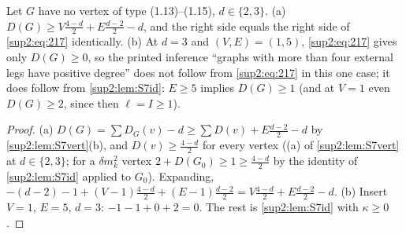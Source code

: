 \begin{lemma}\label{sup2:lem:S7-217}
Let $G$ have no vertex of type (1.13)--(1.15), $d\in\{2,3\}$. \textup{(a)} $D(G)\ge V\frac{4-d}2+E\frac{d-2}2-d$, and the right side equals the right side of \eqref{sup2:eq:217} identically. \textup{(b)} At $d=3$ and $(V,E)=(1,5)$, \eqref{sup2:eq:217} gives only $D(G)\ge0$, so the printed inference ``graphs with more than four external legs have positive degree'' does not follow from \eqref{sup2:eq:217} in this one case; it does follow from \cref{sup2:lem:S7id}: $E\ge5$ implies $D(G)\ge1$ (and at $V=1$ even $D(G)\ge2$, since then $\ell=I\ge1$).
\end{lemma}

\begin{proof}
(a) $D(G)=\sum D_G(v)-d\ge\sum D(v)+E\frac{d-2}2-d$ by \cref{sup2:lem:S7vert}(b), and $D(v)\ge\frac{4-d}2$ for every vertex ((a) of \cref{sup2:lem:S7vert} at $d\in\{2,3\}$; for a $\delta m^2_k$ vertex $2+D(G_0)\ge1\ge\frac{4-d}2$ by the identity of \cref{sup2:lem:S7id} applied to $G_0$). Expanding, $-(d-2)-1+(V-1)\frac{4-d}2+(E-1)\frac{d-2}2=V\frac{4-d}2+E\frac{d-2}2-d$. (b) Insert $V=1$, $E=5$, $d=3$: $-1-1+0+2=0$. The rest is \cref{sup2:lem:S7id} with $\kappa\ge0$.
\end{proof}
